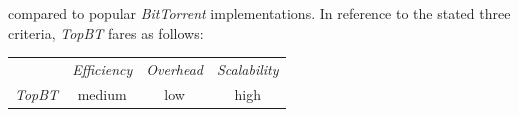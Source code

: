 compared to popular \emph{BitTorrent} implementations.
In reference to the stated three criteria, \emph{TopBT} fares as follows:
\begin{center}
{\footnotesize
\begin{tabular}{rccc}
\multicolumn{1}{r}{} &
\multicolumn{1}{c}{\emph{Efficiency}} &
\multicolumn{1}{c}{\emph{Overhead}} &
\multicolumn{1}{c}{\emph{Scalability}}
\\
\cline{2-4}
\emph{TopBT} &
medium &
low &
high
\end{tabular}
}
\end{center}

